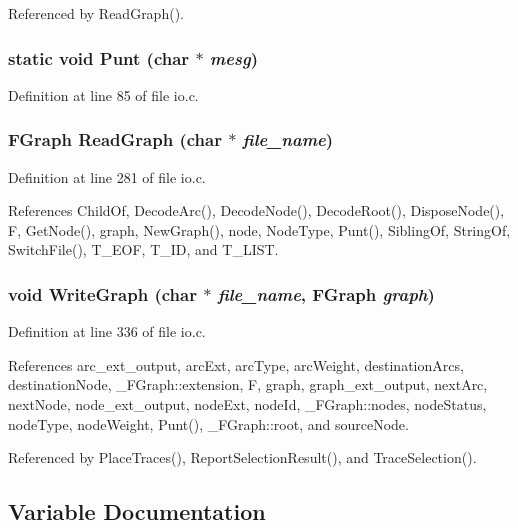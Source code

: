 Referenced by Read\-Graph().
\subsubsection{\setlength{\rightskip}{0pt plus 5cm}static void Punt (char $\ast$ {\em mesg})\hspace{0.3cm}{\tt  [static]}}\label{io_8c_5e4a7703cc8669ffef811a7f4a99562f}




Definition at line 85 of file io.c.
\subsubsection{\setlength{\rightskip}{0pt plus 5cm}\bf{FGraph} Read\-Graph (char $\ast$ {\em file\_\-name})}\label{io_8c_60978194a97b6f9773947483638d7653}




Definition at line 281 of file io.c.

References Child\-Of, Decode\-Arc(), Decode\-Node(), Decode\-Root(), Dispose\-Node(), F, Get\-Node(), graph, New\-Graph(), node, Node\-Type, Punt(), Sibling\-Of, String\-Of, Switch\-File(), T\_\-EOF, T\_\-ID, and T\_\-LIST.
\subsubsection{\setlength{\rightskip}{0pt plus 5cm}void Write\-Graph (char $\ast$ {\em file\_\-name}, \bf{FGraph} {\em graph})}\label{io_8c_43332ea2deb3de2c14269ac1f8703b54}




Definition at line 336 of file io.c.

References arc\_\-ext\_\-output, arc\-Ext, arc\-Type, arc\-Weight, destination\-Arcs, destination\-Node, \_\-FGraph::extension, F, graph, graph\_\-ext\_\-output, next\-Arc, next\-Node, node\_\-ext\_\-output, node\-Ext, node\-Id, \_\-FGraph::nodes, node\-Status, node\-Type, node\-Weight, Punt(), \_\-FGraph::root, and source\-Node.

Referenced by Place\-Traces(), Report\-Selection\-Result(), and Trace\-Selection().

\subsection{Variable Documentation}
